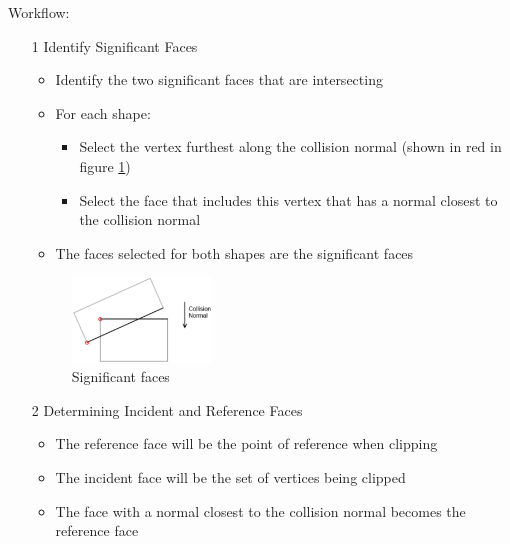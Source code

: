 \documentclass[a4paper]{article}
\begin{document}
Workflow:
\begin{enumerate}
  \item[1]
    Identify Significant Faces
    \begin{itemize}
      \item
        Identify the two significant faces that are intersecting

      \item
        For each shape:
        \begin{itemize}
          \item
            Select the vertex furthest along the collision normal (shown in red
            in figure \ref{fig:manifolds_clipping_1})

          \item
            Select the face that includes this vertex that has a normal closest
            to the collision normal

        \end{itemize}

      \item
        The faces selected for both shapes are the significant faces

    \end{itemize}

    \begin{figure}[h!]
      \centering
      \includegraphics[width=0.35\textwidth]{graphics/manifolds_clipping_1.eps}
      \caption{Significant faces}
      \label{fig:manifolds_clipping_1}
    \end{figure}
    \FloatBarrier

  \item[2]
    Determining Incident and Reference Faces
    \begin{itemize}
      \item
        The reference face will be the point of reference when clipping

      \item
        The incident face will be the set of vertices being clipped

      \item
        The face with a normal closest to the collision normal becomes the
        reference face


\end{itemize}
\end{enumerate}
\end{document}
